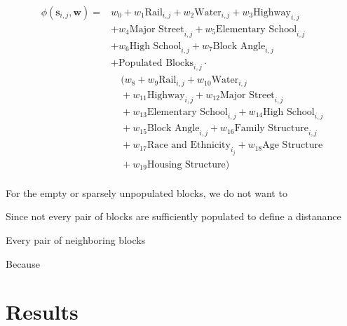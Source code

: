 \documentclass[12pt,letter]{article}\usepackage[]{graphicx}\usepackage[]{color}
\begin{document}
\begin{align}
\phi(\mathbf{s}_{i,j}, \mathbf{w}) =  & w_0 
                                     + w_1\text{Rail}_{i,j} 
                                     + w_2\text{Water}_{i,j} 
                                     + w_3\text{Highway}_{i,j} \\
                                     &+ w_4\text{Major Street}_{i,j} 
                                     + w_5\text{Elementary School}_{i,j}\\ 
                                     & + w_6\text{High School}_{i,j}
                                     + w_7\text{Block Angle}_{i,j} \\
                                     &+ \text{Populated Blocks}_{i,j}\cdot\\
                                     &\quad (w_8
                                     + w_9\text{Rail}_{i,j} 
                                     + w_{10}\text{Water}_{i,j}\\ 
                                     &\quad+ w_{11}\text{Highway}_{i,j}
                                     + w_{12}\text{Major Street}_{i,j}\\ 
                                     &\quad + w_{13}\text{Elementary School}_{i,j} 
                                     + w_{14}\text{High School}_{i,j}\\ 
                                     &\quad + w_{15}\text{Block Angle}_{i,j}
                                     + w_{16}\text{Family Structure}_{i,j}\\
                                     &\quad + w_{17}\text{Race and Ethnicity}_{i_j}
                                     + w_{18}\text{Age Structure}\\  
                                     &\quad+ w_{19}\text{Housing Structure})\\
\end{align}



For the empty or sparsely unpopulated blocks, we do not want to

Since not every pair of blocks are sufficiently populated to define a
distanance

Every pair of neighboring blocks 

Because 

\section*{Results}
\end{document}
